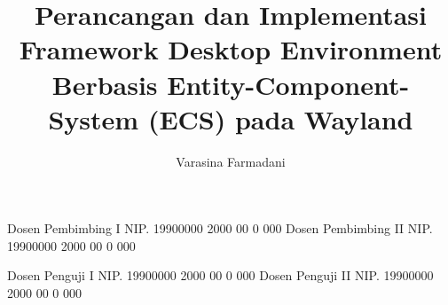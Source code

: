 \documentclass[article]{report} %
\begin{document}
    
    \title{Perancangan dan Implementasi Framework Desktop Environment Berbasis Entity-Component-System (ECS) pada Wayland}
    
	\author{Varasina Farmadani}		%
	
	\dosbingA%
		{Dosen Pembimbing I}%
		{NIP. 19900000 2000 00 0 000}	%
	\dosbingB%
		{Dosen Pembimbing II}%
		{NIP. 19900000 2000 00 0 000}	%
		
	\pengujiA%
		{Dosen Penguji I}%
		{NIP. 19900000 2000 00 0 000}	%
	\pengujiB%
		{Dosen Penguji II}%
		{NIP. 19900000 2000 00 0 000}	%

	\sloppy %
    \setcounter{page}{1} %
\end{document}
